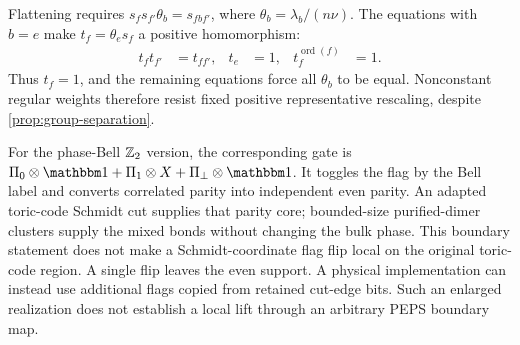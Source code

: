 Flattening requires $s_fs_{f'}\theta_b=s_{fbf'}$, where
$\theta_b=\lambda_b/(n\nu)$. The equations with $b=e$ make
$t_f=\theta_es_f$ a positive homomorphism:
\begin{align}
	t_ft_{f'}                   & =t_{ff'}, &
	t_e                         & =1,       &
	t_f^{\operatorname{ord}(f)} & =1.
\end{align}
Thus $t_f=1$, and the remaining equations force all $\theta_b$
to be equal. Nonconstant regular weights therefore resist fixed
positive representative rescaling, despite
\cref{prop:group-separation}.

For the phase-Bell $\mathbb{Z}_2$ version, the corresponding gate is
$\Pi_0\otimes\Id+\Pi_1\otimes X+\Pi_\perp\otimes\Id$.
It toggles the flag by the Bell label and converts correlated
parity into independent even parity. An adapted toric-code Schmidt
cut supplies that parity core; bounded-size purified-dimer clusters
supply the mixed bonds without changing the bulk phase.
This boundary statement does not make a Schmidt-coordinate flag
flip local on the original toric-code region. A single flip leaves
the even support. A physical implementation can instead use
additional flags copied from retained cut-edge bits. Such an
enlarged realization does not establish a local lift through an
arbitrary PEPS boundary map.

